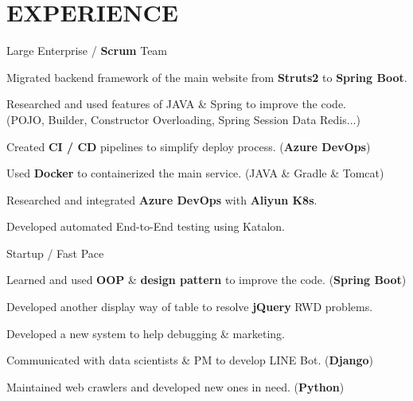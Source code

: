 \documentclass[]{resume}
\begin{document}
\begin{minipage}[t]{0.69\textwidth} 


\section{EXPERIENCE}
\vspace{\topsep} %
\begin{tightemize}
\item Large Enterprise / {\bf Scrum} Team
\item Migrated backend framework of the main website from {\bf Struts2} to {\bf Spring Boot}.
\item Researched and used features of JAVA \& Spring to improve the code. \\ 
      (POJO, Builder, Constructor Overloading, Spring Session Data Redis...)
\item Created {\bf CI / CD} pipelines to simplify deploy process. ({\bf Azure DevOps})
\item Used {\bf Docker} to containerized the main service. (JAVA \& Gradle \& Tomcat)
\item Researched and integrated {\bf Azure DevOps} with {\bf Aliyun K8s}.
\item Developed automated End-to-End testing using Katalon.
\end{tightemize}
\sectionsep

\begin{tightemize}
\item Startup / Fast Pace
\item Learned and used {\bf OOP} \& {\bf design pattern} to improve the code. ({\bf Spring Boot})
\item Developed another display way of table to resolve {\bf jQuery} RWD problems.
\item Developed a new system to help debugging \& marketing.
\item Communicated with data scientists \& PM to develop LINE Bot. ({\bf Django})
\item Maintained web crawlers and developed new ones in need. ({\bf Python})
\end{tightemize}
\sectionsep


\end{minipage}
\end{document}
